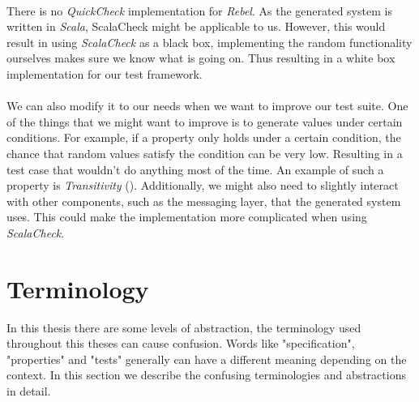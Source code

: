 \\
There is no \textit{QuickCheck} implementation for \textit{Rebel}. As the generated system is written in \textit{Scala}, ScalaCheck might be applicable to us. However, this would result in using \textit{ScalaCheck} as a black box, implementing the random functionality ourselves makes sure we know what is going on. Thus resulting in a white box implementation for our test framework.\\
\\
We can also modify it to our needs when we want to improve our test suite. One of the things that we might want to improve is to generate values under certain conditions. For example, if a property only holds under a certain condition, the chance that random values satisfy the condition can be very low. Resulting in a test case that wouldn't do anything most of the time. An example of such a property is \textit{Transitivity} ().%
Additionally, we might also need to slightly interact with other components, such as the messaging layer, that the generated system uses. This could make the implementation more complicated when using \textit{ScalaCheck}.

\section{Terminology}
In this thesis there are some levels of abstraction, the terminology used throughout this theses can cause confusion. Words like "specification", "properties" and "tests" generally can have a different meaning depending on the context. In this section we describe the confusing terminologies and abstractions in detail.

